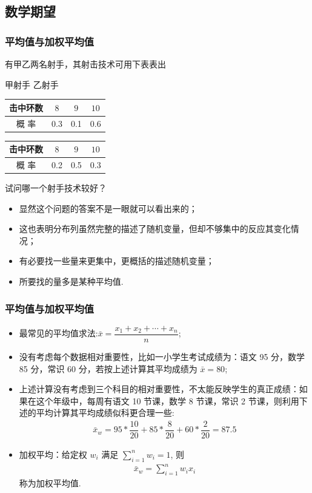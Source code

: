 \documentclass[Prob-All.tex]{subfiles}
\begin{document}
\subsection{数学期望}
\begin{frame}
	\frametitle{平均值与加权平均值}
	有甲乙两名射手，其射击技术可用下表表出 \begin{table}
		甲射手 \qquad \qquad\qquad \qquad \qquad \qquad 乙射手 \\
		\vspace{0.4cm}
		\begin{tabular}{c|c|c|c}
			\hline
			\rowcolor{blue!50}
			击中环数  &$8$ & $9$&$10$\\
			\hline
			概 \quad 率 & 0.3 & 0.1  & 0.6 \\
			\hline
		\end{tabular}
		\begin{tabular}{c|c|c|c}
			\hline
			\rowcolor{blue!50}
			击中环数  &$8$ & $9$&$10$\\
			\hline
			概 \quad 率 & 0.2 & 0.5  & 0.3 \\
			\hline
		\end{tabular}
	\end{table}
	试问哪一个射手技术较好？

	\pause
	\begin{itemize}[<+-|alert@+>]
		\item 显然这个问题的答案不是一眼就可以看出来的；
		\item 这也表明分布列虽然完整的描述了随机变量，但却不够集中的反应其变化情况；
		\item 有必要找一些量来更集中，更概括的描述随机变量；
		\item 所要找的量多是某种平均值.
	\end{itemize}
\end{frame}

\begin{frame}
	\frametitle{平均值与加权平均值}
	\begin{itemize}[<+-|alert@+>]
		\item 最常见的平均值求法:$\bar{x}=\dfrac{x_1+x_2+\cdots+x_n}{n}$;
		\item 没有考虑每个数据相对重要性，比如一小学生考试成绩为：语文 95 分，数学 85 分，常识 60 分，若按上述计算其平均成绩为 $\bar{x}=80$;
		\item 上述计算没有考虑到三个科目的相对重要性，不太能反映学生的真正成绩：如果在这个年级中，每周有语文 10 节课，数学 8 节课，常识 2 节课，则利用下述的平均计算其平均成绩似科更合理一些:
		\begin{eqnarray*}
			\bar{x}_w=95*\dfrac{10}{20}+85*\dfrac{8}{20}+60*\dfrac{2}{20}=87.5
		\end{eqnarray*}
		\item 加权平均：给定权 $w_i$ 满足 $\sum_{i=1}^nw_i=1$, 则
		\begin{eqnarray*}
			\bar{x}_w=\sum_{i=1}^nw_ix_i
		\end{eqnarray*}
		称为加权平均值.
	\end{itemize}
\end{frame}
\end{document}
